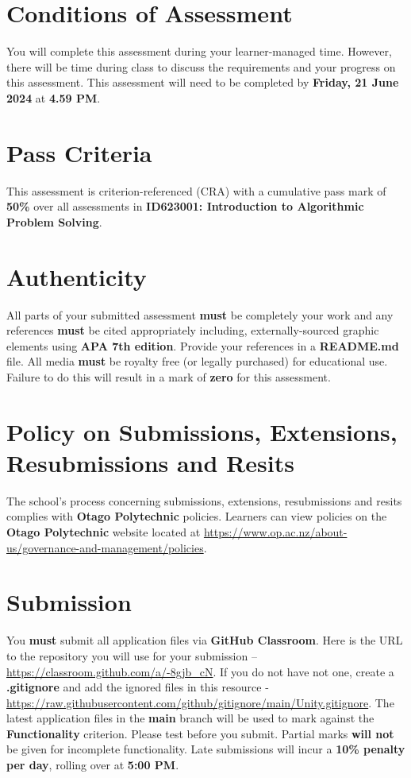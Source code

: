 \documentclass{article}
\begin{document}
\section*{Conditions of Assessment}
You will complete this assessment during your learner-managed time. However, there will be time during class to discuss the requirements and your progress on this assessment. This assessment will need to be completed by \textbf{Friday, 21 June 2024} at \textbf{4.59 PM}. 

\section*{Pass Criteria}
This assessment is criterion-referenced (CRA) with a cumulative pass mark of \textbf{50\%} over all assessments in \textbf{ID623001: Introduction to Algorithmic Problem Solving}.

\section*{Authenticity}
All parts of your submitted assessment \textbf{must} be completely your work and any references \textbf{must} be cited appropriately including, externally-sourced graphic elements using \textbf{APA 7th edition}. Provide your references in a \textbf{README.md} file. All media \textbf{must} be royalty free (or legally purchased) for educational use. Failure to do this will result in a mark of \textbf{zero} for this assessment.

\section*{Policy on Submissions, Extensions, Resubmissions and Resits}
The school's process concerning submissions, extensions, resubmissions and resits complies with \textbf{Otago Polytechnic} policies. Learners can view policies on the \textbf{Otago Polytechnic} website located at \href{https://www.op.ac.nz/about-us/governance-and-management/policies}{https://www.op.ac.nz/about-us/governance-and-management/policies}.

\section*{Submission}
You \textbf{must} submit all application files via \textbf{GitHub Classroom}. Here is the URL to the repository you will use for your submission – \href{https://classroom.github.com/a/-8gjb\_cN}{https://classroom.github.com/a/-8gjb\_cN}. If you do not have not one, create a \textbf{.gitignore} and add the ignored files in this resource - \href{https://raw.githubusercontent.com/github/gitignore/main/Unity.gitignore}{https://raw.githubusercontent.com/github/gitignore/main/Unity.gitignore}. The latest application files in the \textbf{main} branch will be used to mark against the \textbf{Functionality} criterion. Please test before you submit. Partial marks \textbf{will not} be given for incomplete functionality. Late submissions will incur a \textbf{10\% penalty per day}, rolling over at \textbf{5:00 PM}. 
\end{document}
